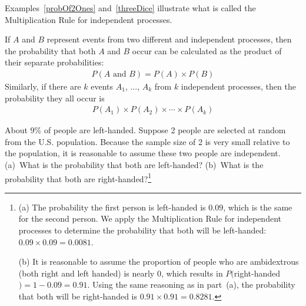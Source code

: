 Examples~\ref{probOf2Ones} and~\ref{threeDice} illustrate what is called the Multiplication Rule for independent processes.

\begin{termBox}{
If $A$ and $B$ represent events from two different and independent processes, then the probability that both $A$ and $B$ occur can be calculated as the product of their separate probabilities: \vspace{-1.5mm}
\begin{eqnarray}\label{eqForIndependentEvents}
P(A \text{ and }B) = P(A) \times  P(B)
\end{eqnarray}
Similarly, if there are $k$ events $A_1$, ..., $A_k$ from $k$ independent processes, then the probability they all occur is\vspace{-1.5mm}
\begin{eqnarray*}
P(A_1) \times  P(A_2)\times  \cdots \times  P(A_k)
\end{eqnarray*}\vspace{-6mm}}
\end{termBox}

\begin{exercise} \label{ex2Handedness}
About 9\% of people are left-handed. Suppose 2 people are selected at random from the U.S. population. Because the sample size of 2 is very small relative to the population, it is reasonable to assume these two people are independent. (a)~What is the probability that both are left-handed? (b)~What is the probability that both are right-handed?\footnote{(a) The probability the first person is left-handed is $0.09$, which is the same for the second person. We apply the Multiplication Rule for independent processes to determine the probability that both will be left-handed: $0.09\times 0.09 = 0.0081$.

(b) It is reasonable to assume the proportion of people who are ambidextrous (both right and left handed) is nearly 0, which results in $P($right-handed$)=1-0.09=0.91$. Using the same reasoning as in part~(a), the probability that both will be right-handed is $0.91\times 0.91 = 0.8281$.}
\end{exercise}

